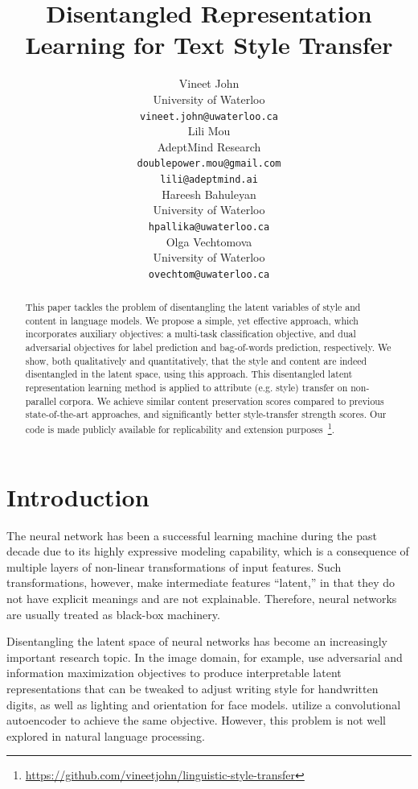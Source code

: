 \documentclass[letterpaper]{article} %
\title{Disentangled Representation Learning for Text Style Transfer}
\author{
	Vineet John \\
	University of Waterloo \\
	{\tt vineet.john@uwaterloo.ca} \\
	\And
	Lili Mou \\
	AdeptMind Research \\
	{\tt doublepower.mou@gmail.com}\\{\tt lili@adeptmind.ai} \\
	\AND
	Hareesh Bahuleyan \\
	University of Waterloo \\
	{\tt hpallika@uwaterloo.ca} \\
	\And
	Olga Vechtomova \\
	University of Waterloo \\
	{\tt ovechtom@uwaterloo.ca} \\
}
\date{}
\newcommand{\citeay}[1]{\citeauthor{#1} \shortcite{#1}}
\begin{document}
\maketitle
\graphicspath{{images/}}

\begin{abstract}
	This paper tackles the problem of disentangling the latent variables of style and content in language models.
	We propose a simple, yet effective approach, which incorporates auxiliary objectives: a multi-task classification objective, and dual adversarial objectives for label prediction and bag-of-words prediction, respectively.
	We show, both qualitatively and quantitatively, that the style and content are indeed disentangled in the latent space, using this approach.
	This disentangled latent representation learning method is applied to attribute (e.g. style) transfer on non-parallel corpora.
	We achieve similar content preservation scores compared to previous state-of-the-art approaches, and significantly better style-transfer strength scores.
	Our code is made publicly available for replicability and extension purposes~\footnote{\url{https://github.com/vineetjohn/linguistic-style-transfer}}.
\end{abstract}

% 


\section{Introduction}

The neural network has been a successful learning machine during the past decade due to its highly expressive modeling capability, which is a consequence of multiple layers of non-linear transformations of input features. Such transformations, however, make intermediate features ``latent,'' in that they do not have explicit meanings and are not explainable. Therefore, neural networks are usually treated as black-box machinery.

Disentangling the latent space of neural networks has become an increasingly important research topic. In the image domain, for example, \citeay{chen2016infogan} use adversarial and information maximization objectives to produce interpretable latent representations that can be tweaked to adjust writing style for handwritten digits, as well as lighting and orientation for face models. \citeay{mathieu2016disentangling} utilize a convolutional autoencoder to achieve the same objective. However, this problem is not well explored in natural language processing.
\end{document}
